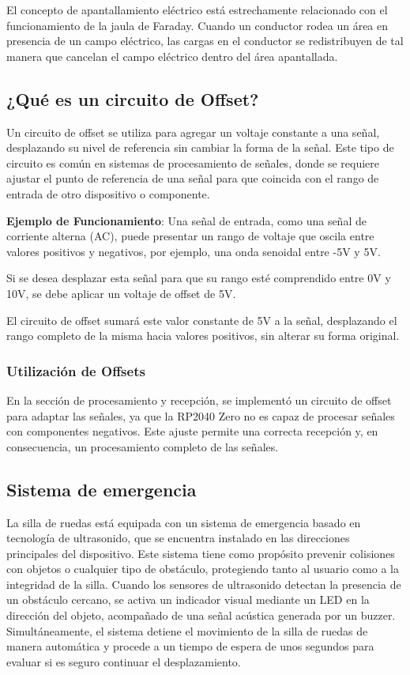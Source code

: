 \documentclass{article}
\begin{document}
El concepto de apantallamiento eléctrico está estrechamente relacionado con el funcionamiento de la jaula de Faraday. Cuando un conductor rodea un área en presencia de un campo eléctrico, las cargas en el conductor se redistribuyen de tal manera que cancelan el campo eléctrico dentro del área apantallada.

\subsection{¿Qué es un circuito de Offset?}

Un circuito de offset se utiliza para agregar un voltaje constante a una señal, desplazando su nivel de referencia sin cambiar la forma de la señal. Este tipo de circuito es común en sistemas de procesamiento de señales, donde se requiere ajustar el punto de referencia de una señal para que coincida con el rango de entrada de otro dispositivo o componente.

\textbf{Ejemplo de Funcionamiento}: Una señal de entrada, como una señal de corriente alterna (AC), puede presentar un rango de voltaje que oscila entre valores positivos y negativos, por ejemplo, una onda senoidal entre -5V y 5V.

Si se desea desplazar esta señal para que su rango esté comprendido entre 0V y 10V, se debe aplicar un voltaje de offset de 5V.

El circuito de offset sumará este valor constante de 5V a la señal, desplazando el rango completo de la misma hacia valores positivos, sin alterar su forma original.

\subsubsection{Utilización de Offsets}

En la sección de procesamiento y recepción, se implementó un circuito de offset para adaptar las señales, ya que la RP2040 Zero no es capaz de procesar señales con componentes negativos. Este ajuste permite una correcta recepción y, en consecuencia, un procesamiento completo de las señales.



\subsection{Sistema de emergencia}

La silla de ruedas está equipada con un sistema de emergencia basado en tecnología de ultrasonido, que se encuentra instalado en las direcciones principales del dispositivo. Este sistema tiene como propósito prevenir colisiones con objetos o cualquier tipo de obstáculo, protegiendo tanto al usuario como a la integridad de la silla. Cuando los sensores de ultrasonido detectan la presencia de un obstáculo cercano, se activa un indicador visual mediante un LED en la dirección del objeto, acompañado de una señal acústica generada por un buzzer. Simultáneamente, el sistema detiene el movimiento de la silla de ruedas de manera automática y procede a un tiempo de espera de unos segundos para evaluar si es seguro continuar el desplazamiento.
\end{document}
